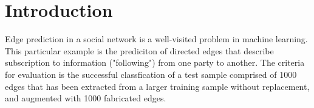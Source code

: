 

\section{Introduction}
Edge prediction in a social network is a well-visited problem in machine learning. This particular example is the prediciton of directed edges that describe subscription to information ("following") from one party to another. The criteria for evaluation is the successful classfication of a test sample comprised of 1000 edges that has been extracted from a larger training sample without replacement, and augmented with 1000 fabricated edges.

%

